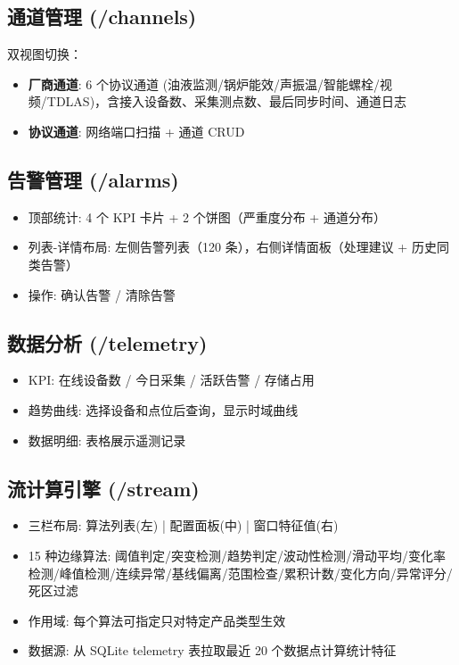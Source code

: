 \documentclass[12pt,a4paper]{ctexart}
\begin{document}
\subsection{通道管理 (/channels)}
双视图切换：
\begin{itemize}[leftmargin=*]
  \item \textbf{厂商通道}: 6 个协议通道 (油液监测/锅炉能效/声振温/智能螺栓/视频/TDLAS)，含接入设备数、采集测点数、最后同步时间、通道日志
  \item \textbf{协议通道}: 网络端口扫描 + 通道 CRUD
\end{itemize}

\subsection{告警管理 (/alarms)}
\begin{itemize}[leftmargin=*]
  \item 顶部统计: 4 个 KPI 卡片 + 2 个饼图（严重度分布 + 通道分布）
  \item 列表-详情布局: 左侧告警列表（120 条），右侧详情面板（处理建议 + 历史同类告警）
  \item 操作: 确认告警 / 清除告警
\end{itemize}

\subsection{数据分析 (/telemetry)}
\begin{itemize}[leftmargin=*]
  \item KPI: 在线设备数 / 今日采集 / 活跃告警 / 存储占用
  \item 趋势曲线: 选择设备和点位后查询，显示时域曲线
  \item 数据明细: 表格展示遥测记录
\end{itemize}

\subsection{流计算引擎 (/stream)}
\begin{itemize}[leftmargin=*]
  \item 三栏布局: 算法列表(左) | 配置面板(中) | 窗口特征值(右)
  \item 15 种边缘算法: 阈值判定/突变检测/趋势判定/波动性检测/滑动平均/变化率检测/峰值检测/连续异常/基线偏离/范围检查/累积计数/变化方向/异常评分/死区过滤
  \item 作用域: 每个算法可指定只对特定产品类型生效
  \item 数据源: 从 SQLite telemetry 表拉取最近 20 个数据点计算统计特征
\end{itemize}
\end{document}
